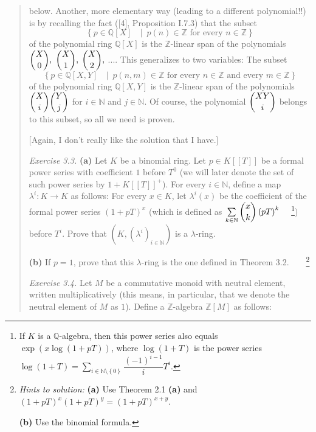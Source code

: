 \documentclass[12pt,final,notitlepage,onecolumn,german]{article}%
\begin{document}
\begin{quotation}
{below. Another, more elementary way (leading to a different polynomial!!) is
by recalling the fact ([4], Proposition I.7.3) that the subset%
\[
\left\{  p\in\mathbb{Q}\left[  X\right]  \text{ }\mid\ p\left(  n\right)
\in\mathbb{Z}\text{ for every }n\in\mathbb{Z}\right\}
\]
of the polynomial ring $\mathbb{Q}\left[  X\right]  $ is the $\mathbb{Z}%
$-linear span of the polynomials $\dbinom{X}{0},$ $\dbinom{X}{1},$ $\dbinom
{X}{2},$ $...$. This generalizes to two variables: The subset
\[
\left\{  p\in\mathbb{Q}\left[  X,Y\right]  \text{ }\mid\ p\left(  n,m\right)
\in\mathbb{Z}\text{ for every }n\in\mathbb{Z}\text{ and every }m\in
\mathbb{Z}\right\}
\]
of the polynomial ring $\mathbb{Q}\left[  X,Y\right]  $ is the $\mathbb{Z}%
$-linear span of the polynomials $\dbinom{X}{i}\dbinom{Y}{j}$ for
$i\in\mathbb{N}$ and $j\in\mathbb{N}$. Of course, the polynomial $\dbinom
{XY}{i}$ belongs to this subset, so all we need is proven.}

[Again, I don't really like the solution that I have.]

\textit{Exercise 3.3.} \textbf{(a)} Let $K$ be a binomial ring. Let $p\in
K\left[  \left[  T\right]  \right]  $ be a formal power series with
coefficient $1$ before $T^{0}$ (we will later denote the set of such power
series by $1+K\left[  \left[  T\right]  \right]  ^{+}$). For every
$i\in\mathbb{N}$, define a map $\lambda^{i}:K\rightarrow K$ as follows: For
every $x\in K$, let $\lambda^{i}\left(  x\right)  $ be the coefficient of the
formal power series $\left(  1+pT\right)  ^{x}$ (which is defined as
$\sum\limits_{k\in\mathbb{N}}\dbinom{x}{k}\left(  pT\right)  ^{k}%
\ \ \ \ $\footnote{If $K$ is a $\mathbb{Q}$-algebra, then this power series
also equals $\exp\left(  x\log\left(  1+pT\right)  \right)  $, where
$\log\left(  1+T\right)  $ is the power series $\log\left(  1+T\right)
=\sum\limits_{i\in\mathbb{N}\setminus\left\{  0\right\}  }\dfrac{\left(
-1\right)  ^{i-1}}{i}T^{i}$.}) before $T^{i}$. Prove that $\left(  K,\left(
\lambda^{i}\right)  _{i\in\mathbb{N}}\right)  $ is a $\lambda$-ring.

\textbf{(b)} If $p=1$, prove that this $\lambda$-ring is the one defined in
Theorem 3.2.\ \ \ \ \footnote{\textit{Hints to solution:} \textbf{(a)} Use
Theorem 2.1 \textbf{(a)} and $\left(  1+pT\right)  ^{x}\left(  1+pT\right)
^{y}=\left(  1+pT\right)  ^{x+y}$.
\par
\textbf{(b)} Use the binomial formula.}

\textit{Exercise 3.4.} Let $M$ be a commutative monoid with neutral element,
written multiplicatively (this means, in particular, that we denote the
neutral element of $M$ as $1$). Define a $\mathbb{Z}$-algebra $\mathbb{Z}%
\left[  M\right]  $ as follows:


\end{quotation}
\end{document}
